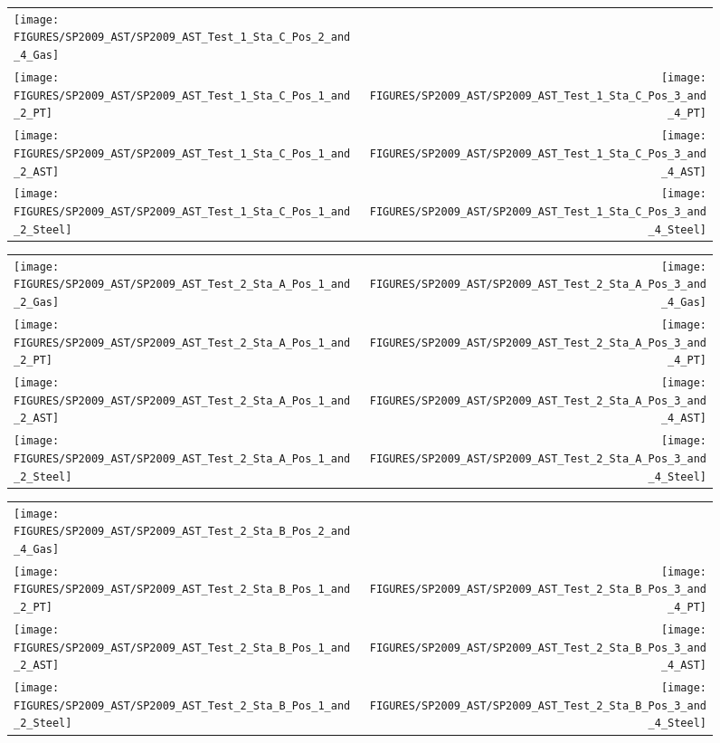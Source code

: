 \begin{figure}[p]
\begin{tabular*}{\textwidth}{l@{\extracolsep{\fill}}r}
\texttt{[image: FIGURES/SP2009\_AST/SP2009\_AST\_Test\_1\_Sta\_C\_Pos\_2\_and\_4\_Gas]} &
  \\
\texttt{[image: FIGURES/SP2009\_AST/SP2009\_AST\_Test\_1\_Sta\_C\_Pos\_1\_and\_2\_PT]} &
\texttt{[image: FIGURES/SP2009\_AST/SP2009\_AST\_Test\_1\_Sta\_C\_Pos\_3\_and\_4\_PT]} \\
\texttt{[image: FIGURES/SP2009\_AST/SP2009\_AST\_Test\_1\_Sta\_C\_Pos\_1\_and\_2\_AST]} &
\texttt{[image: FIGURES/SP2009\_AST/SP2009\_AST\_Test\_1\_Sta\_C\_Pos\_3\_and\_4\_AST]} \\
\texttt{[image: FIGURES/SP2009\_AST/SP2009\_AST\_Test\_1\_Sta\_C\_Pos\_1\_and\_2\_Steel]} &
\texttt{[image: FIGURES/SP2009\_AST/SP2009\_AST\_Test\_1\_Sta\_C\_Pos\_3\_and\_4\_Steel]}
\end{tabular*}
\label{SP_Test_1_Station_C}
\end{figure}


\begin{figure}[p]
\begin{tabular*}{\textwidth}{l@{\extracolsep{\fill}}r}
\texttt{[image: FIGURES/SP2009\_AST/SP2009\_AST\_Test\_2\_Sta\_A\_Pos\_1\_and\_2\_Gas]} &
\texttt{[image: FIGURES/SP2009\_AST/SP2009\_AST\_Test\_2\_Sta\_A\_Pos\_3\_and\_4\_Gas]} \\
\texttt{[image: FIGURES/SP2009\_AST/SP2009\_AST\_Test\_2\_Sta\_A\_Pos\_1\_and\_2\_PT]} &
\texttt{[image: FIGURES/SP2009\_AST/SP2009\_AST\_Test\_2\_Sta\_A\_Pos\_3\_and\_4\_PT]} \\
\texttt{[image: FIGURES/SP2009\_AST/SP2009\_AST\_Test\_2\_Sta\_A\_Pos\_1\_and\_2\_AST]} &
\texttt{[image: FIGURES/SP2009\_AST/SP2009\_AST\_Test\_2\_Sta\_A\_Pos\_3\_and\_4\_AST]} \\
\texttt{[image: FIGURES/SP2009\_AST/SP2009\_AST\_Test\_2\_Sta\_A\_Pos\_1\_and\_2\_Steel]} &
\texttt{[image: FIGURES/SP2009\_AST/SP2009\_AST\_Test\_2\_Sta\_A\_Pos\_3\_and\_4\_Steel]}
\end{tabular*}
\label{SP_Test_2_Station_A}
\end{figure}

\begin{figure}[p]
\begin{tabular*}{\textwidth}{l@{\extracolsep{\fill}}r}
\texttt{[image: FIGURES/SP2009\_AST/SP2009\_AST\_Test\_2\_Sta\_B\_Pos\_2\_and\_4\_Gas]} &
  \\
\texttt{[image: FIGURES/SP2009\_AST/SP2009\_AST\_Test\_2\_Sta\_B\_Pos\_1\_and\_2\_PT]} &
\texttt{[image: FIGURES/SP2009\_AST/SP2009\_AST\_Test\_2\_Sta\_B\_Pos\_3\_and\_4\_PT]} \\
\texttt{[image: FIGURES/SP2009\_AST/SP2009\_AST\_Test\_2\_Sta\_B\_Pos\_1\_and\_2\_AST]} &
\texttt{[image: FIGURES/SP2009\_AST/SP2009\_AST\_Test\_2\_Sta\_B\_Pos\_3\_and\_4\_AST]} \\
\texttt{[image: FIGURES/SP2009\_AST/SP2009\_AST\_Test\_2\_Sta\_B\_Pos\_1\_and\_2\_Steel]} &
\texttt{[image: FIGURES/SP2009\_AST/SP2009\_AST\_Test\_2\_Sta\_B\_Pos\_3\_and\_4\_Steel]}
\end{tabular*}
\label{SP_Test_2_Station_B}
\end{figure}

